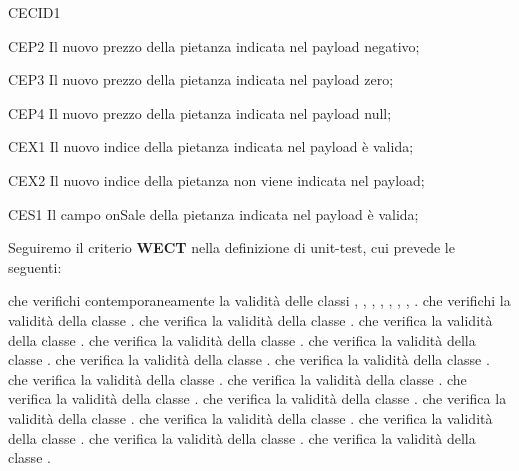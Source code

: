 \begin{eqpart}{CECID1}
	\item[CEP2] Il nuovo prezzo della pietanza indicata nel payload negativo;
	\item[CEP3] Il nuovo prezzo della pietanza indicata nel payload zero;
	\item[CEP4] Il nuovo prezzo della pietanza indicata nel payload null;
	\item[CEX1] Il nuovo indice della pietanza indicata nel payload è valida;
	\item[CEX2] Il nuovo indice della pietanza non viene indicata nel payload;
	\item[CES1] Il campo onSale della pietanza indicata nel payload è valida;
\end{eqpart}

\newpage
Seguiremo il criterio \textbf{WECT} nella
definizione di unit-test, cui prevede le seguenti:
\begin{eqtest}
	 che verifichi contemporaneamente la validità delle classi , , ,
	, , , , .
	 che verifichi la validità della classe .
	 che verifica la validità della classe .
	 che verifica la validità della classe .
	 che verifica la validità della classe .
	 che verifica la validità della classe . 
	 che verifica la validità della classe .
	 che verifica la validità della classe .
	 che verifica la validità della classe .
	 che verifica la validità della classe .
	 che verifica la validità della classe .
	 che verifica la validità della classe .
	 che verifica la validità della classe .
	 che verifica la validità della classe .
	 che verifica la validità della classe .
	 che verifica la validità della classe .
	 che verifica la validità della classe .
\end{eqtest}

